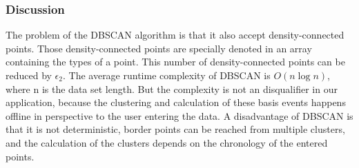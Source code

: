 \subsubsection{Discussion}
The problem of the DBSCAN algorithm is that it also accept density-connected points.
Those density-connected points are specially denoted in an array containing the types of a point. This number of density-connected points can be reduced by $\epsilon_{2}$.
The average runtime complexity of DBSCAN is $O(n \log n)$, where n is the data set length. But the complexity is not an disqualifier in our application, because the clustering and calculation of these basis events happens offline in perspective to the user entering the data.
A disadvantage of DBSCAN is that it is not deterministic, border points can be reached from multiple clusters, and the calculation of the clusters depends on the chronology of the entered points.
